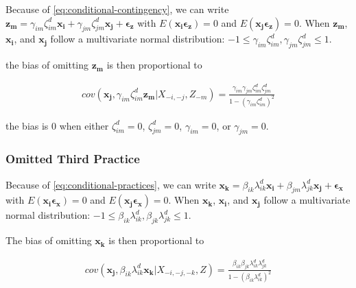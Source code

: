 \documentclass[12pt]{article}
\begin{document}
Because of \eqref{eq:conditional-contingency}, we can write $\mathbf{z_m} = \gamma_{im} \zeta^d_{im} \mathbf{x_i} + \gamma_{jm} \zeta^d_{jm} \mathbf{x_j} + \mathbf{\epsilon_z}$ with $E(\mathbf{x_i \epsilon_z}) = 0$ and $E(\mathbf{x_j \epsilon_z}) = 0$. When $\mathbf{z_m}$, $\mathbf{x_i}$, and $\mathbf{x_j}$ follow a multivariate normal distribution: $-1 \leq \gamma_{im} \zeta^d_{im}, \gamma_{jm} \zeta^d_{jm} \leq 1$. 

the bias of omitting $\mathbf{z_m}$ is then proportional to

\begin{align*}
    cov(\mathbf{x_j}, \gamma_{im} \zeta^d_{im} \mathbf{z_m} | X_{-i, -j}, Z_{-m}) = \frac{\gamma_{im} \gamma_{jm} \zeta^d_{im} \zeta^d_{jm}}{1 - (\gamma_{im} \zeta^d_{im})^2}
\end{align*}

the bias is 0 when either $\zeta^d_{im} = 0$, $\zeta^d_{jm} = 0$, $\gamma_{im} = 0$, or $\gamma_{jm} = 0$.

\subsubsection{Omitted Third Practice}

Because of \eqref{eq:conditional-practices}, we can write $\mathbf{x_k} = \beta_{ik} \lambda^d_{ik} \mathbf{x_i} + \beta_{jm} \lambda^d_{jk} \mathbf{x_j} + \mathbf{\epsilon_x}$ with $E(\mathbf{x_i \epsilon_x}) = 0$ and $E(\mathbf{x_j \epsilon_x}) = 0$. When $\mathbf{x_k}$, $\mathbf{x_i}$, and $\mathbf{x_j}$ follow a multivariate normal distribution: $-1 \leq \beta_{ik} \lambda^d_{ik}, \beta_{jk} \lambda^d_{jk} \leq 1$. 

The bias of omitting $\mathbf{x_k}$ is then proportional to

\begin{align*}
    cov(\mathbf{x_j}, \beta_{ik} \lambda^d_{ik} \mathbf{x_k} | X_{-i, -j, -k}, Z) = \frac{\beta_{ik} \beta_{jk} \lambda^d_{ik} \lambda^d_{jk}}{1 - (\beta_{ik} \lambda^d_{ik})^2}
\end{align*}
\end{document}
